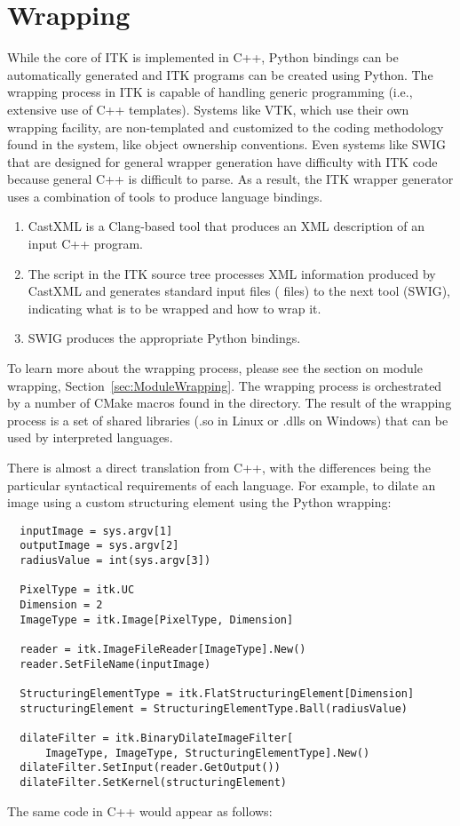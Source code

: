 \section{Wrapping}
\label{sec:Wrapping}


While the core of ITK is implemented in C++, Python bindings can be
automatically generated and ITK programs can be created using Python.  The
wrapping process in ITK is capable of handling generic programming (i.e.,
extensive use of C++ templates). Systems like VTK, which use their own
wrapping facility, are non-templated and customized to the coding methodology
found in the system, like object ownership conventions. Even systems
like SWIG that are designed for general wrapper generation have difficulty
with ITK code because general C++ is difficult to parse. As a result, the ITK
wrapper generator uses a combination of tools to produce language bindings.

\begin{enumerate}
  \item CastXML is a Clang-based tool that
    produces an XML description of an input C++ program.
  \item The  script in the ITK source tree processes XML
    information produced by CastXML and generates standard input files
    ( files) to the next tool (SWIG), indicating what is to be wrapped
    and how to wrap it.
  \item SWIG produces the appropriate Python bindings.
\end{enumerate}

To learn more about the wrapping process, please see the section on module
wrapping, Section~\ref{sec:ModuleWrapping}.  The wrapping process is orchestrated by a
number of CMake macros found in the  directory. The result of
the wrapping process is a set of shared libraries (.so in Linux or .dlls on
Windows) that can be used by interpreted languages.

There is almost a direct translation from C++, with the differences being the
particular syntactical requirements of each language. For example, to dilate an
image using a custom structuring element using the Python wrapping:

\small
\begin{verbatim}
  inputImage = sys.argv[1]
  outputImage = sys.argv[2]
  radiusValue = int(sys.argv[3])

  PixelType = itk.UC
  Dimension = 2
  ImageType = itk.Image[PixelType, Dimension]

  reader = itk.ImageFileReader[ImageType].New()
  reader.SetFileName(inputImage)

  StructuringElementType = itk.FlatStructuringElement[Dimension]
  structuringElement = StructuringElementType.Ball(radiusValue)

  dilateFilter = itk.BinaryDilateImageFilter[
      ImageType, ImageType, StructuringElementType].New()
  dilateFilter.SetInput(reader.GetOutput())
  dilateFilter.SetKernel(structuringElement)
\end{verbatim}
\normalsize
The same code in C++ would appear as follows:

